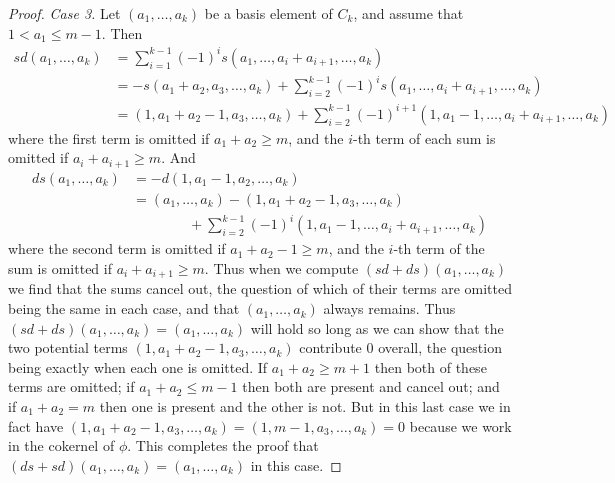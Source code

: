 \documentclass[a4paper, 11 pt, oneside, reqno]{amsart}
\numberwithin{lemma}{section}
\theoremstyle{definition}
\begin{document}
\begin{proof}
    \emph{Case 3.}
    Let $(a_1,\ldots,a_k)$ be a basis element of $C_k$,
    and assume that $1< a_1\leq m-1$.
    Then 
    \begin{align*}
        sd(a_1,\ldots,a_k)
        &=
        \sum_{i=1}^{k-1} (-1)^i
        s(a_1,\ldots,a_i+a_{i+1},\ldots,a_k)
        \\
        &=
        -s(a_1+a_2,a_3,\ldots,a_k)
        +
        \sum_{i=2}^{k-1} (-1)^i 
        s(a_1,\ldots,a_i+a_{i+1},\ldots,a_k)
        \\
        &=
        (1,a_1+a_2-1,a_3,\ldots,a_k)
        +
        \sum_{i=2}^{k-1} (-1)^{i+1} 
        (1,a_1-1,\ldots,a_i+a_{i+1},\ldots,a_k)
    \end{align*}
    where the first term is omitted if $a_1+a_2\geq m$,
    and the $i$-th term of each sum is omitted if
    $a_i+a_{i+1}\geq m$.
    And
    \begin{align*}
        ds(a_1,\ldots,a_k)
        &=
        -d(1,a_1-1,a_2,\ldots,a_k)
        \\
        &=
        (a_1,\ldots,a_k)
        -
        (1,a_1+a_2-1,a_3,\ldots,a_k)
        \\
        &\qquad\qquad
        +\sum_{i=2}^{k-1} (-1)^i
        (1,a_1-1,\ldots,a_i+a_{i+1},\ldots,a_k)
    \end{align*}
    where the second term is omitted if $a_1+a_2-1\geq m$,
    and the $i$-th term of the sum is omitted if
    $a_i+a_{i+1}\geq m$.
    Thus when we compute $(sd+ds)(a_1,\ldots,a_k)$
    we find that the sums cancel out,
    the question of which of their terms are omitted being
    the same in each case,
    and that $(a_1,\ldots,a_k)$ always remains.
    Thus $(sd+ds)(a_1,\ldots,a_k)=(a_1,\ldots,a_k)$
    will hold so long as we can show that 
    the two potential terms $(1,a_1+a_2-1,a_3,\ldots,a_k)$ 
    contribute $0$ overall, 
    the question being exactly when each one is omitted.
    If $a_1+a_2\geq m+1$ then both of these terms are omitted;
    if $a_1+a_2\leq m-1$ then both are present and cancel out;
    and if $a_1+a_2=m$ then one is present and the other is not.
    But in this last case we in fact have
    $(1,a_1+a_2-1,a_3,\ldots,a_k) =(1,m-1,a_3,\ldots,a_k)=0$
    because we work in the cokernel of $\phi$.
    This completes the proof that $(ds+sd)(a_1,\ldots,a_k)
    =(a_1,\ldots,a_k)$ in this case.
\end{proof}
\end{document}
